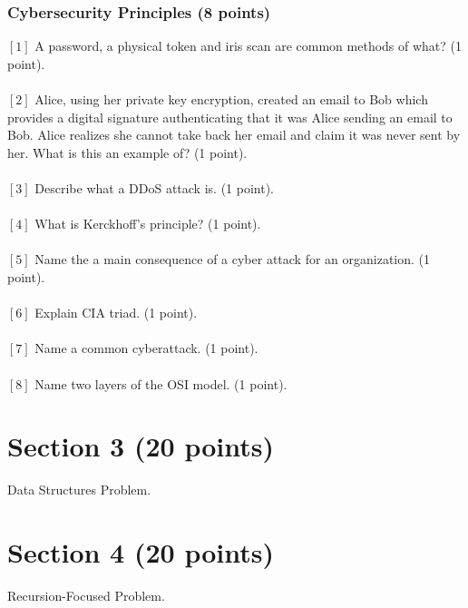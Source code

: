 \documentclass[letterpaper,12pt,addpoints]{exam}
\begin{document}
\subsubsection*{Cybersecurity Principles (8 points)} 
$[1]$ A password, a physical token and iris scan are common methods of what? (1 point).\\
\\
$[2]$ Alice, using her private key encryption, created an email to Bob which provides a digital signature authenticating that it was Alice sending an email to Bob. Alice realizes she cannot take back her email and claim it was never sent by her. What is this an example of? (1 point).\\
\\
$[3]$ Describe what a DDoS attack is. (1 point). \\
\\
$[4]$ What is Kerckhoff’s principle? (1 point).\\
\\
$[5]$ Name the a main consequence of a cyber attack for an organization. (1 point).\\
\\
$[6]$ Explain CIA triad. (1 point).\\
\\
$[7]$ Name a common cyberattack. (1 point).\\
\\
$[8]$ Name two layers of the OSI model. (1 point).

\section*{Section 3 (20 points)}
Data Structures Problem. 
\section*{Section 4 (20 points)}
Recursion-Focused Problem. 
\end{document}
